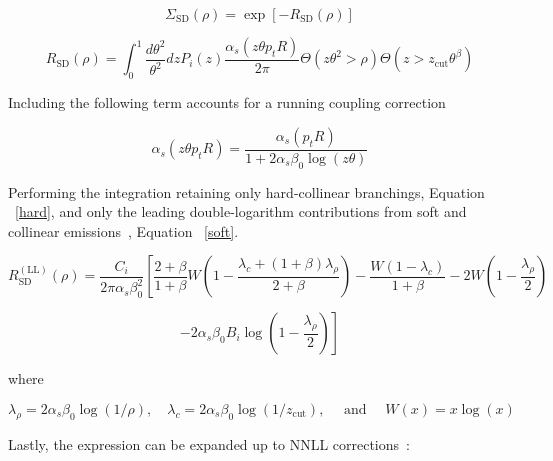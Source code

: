 \begin{equation}
\Sigma_{\mathrm{SD}}(\rho)=\exp \left[-R_{\mathrm{SD}}(\rho)\right]
\end{equation}



\begin{equation}
R_{\mathrm{SD}}(\rho)=\int_{0}^{1} \frac{d \theta^{2}}{\theta^{2}} d z P_{i}(z) \frac{\alpha_{s}\left(z \theta p_{t} R\right)}{2 \pi} \Theta\left(z \theta^{2}>\rho\right) \Theta\left(z>z_{\mathrm{cut}} \theta^{\beta}\right)
\end{equation}


Including the following term accounts for a running coupling correction~\cite{Marzani:2019hun}

\begin{equation}
\alpha_{s}\left(z \theta p_{t} R\right)=\frac{\alpha_{s}\left(p_{t} R\right)}{1+2 \alpha_{s} \beta_{0} \log (z \theta)}
\end{equation}


Performing the integration retaining only hard-collinear branchings, Equation ~\ref{hard}, and only the leading double-logarithm contributions from soft and collinear emissions~\cite{Marzani:2019hun}, Equation ~\ref{soft}.



\begin{equation}
R_{\mathrm{SD}}^{(\mathrm{LL})}(\rho)=\frac{C_{i}}{2 \pi \alpha_{s} \beta_{0}^{2}}\left[\frac{2+\beta}{1+\beta} W\left(1-\frac{\lambda_{c}+(1+\beta) \lambda_{\rho}}{2+\beta}\right)-\frac{W\left(1-\lambda_{c}\right)}{1+\beta}-2 W\left(1-\frac{\lambda_{\rho}}{2}\right)\right.
\end{equation}\label{soft}



\begin{equation}
\left.-2 \alpha_{s} \beta_{0} B_{i} \log \left(1-\frac{\lambda_{\rho}}{2}\right)\right]
\end{equation}\label{hard}

where

\begin{equation}
\lambda_{\rho}=2 \alpha_{s} \beta_{0} \log (1 / \rho), \quad \lambda_{c}=2 \alpha_{s} \beta_{0} \log \left(1 / z_{\mathrm{cut}}\right), \quad \text { and } \quad W(x)=x \log (x)
\end{equation}



Lastly, the expression can be expanded up to NNLL corrections~\cite{Marzani:2019hun}:


